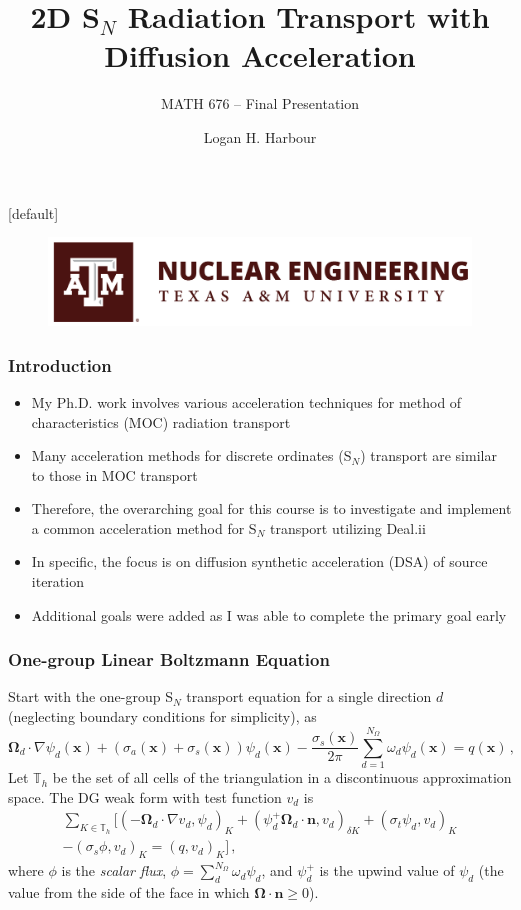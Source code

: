 \documentclass[xcolor={usenames,dvipsnames,svgnames,table}, 10pt]{beamer}
\title[2D S$_N$ with Diffusion Acceleration]{2D S$_N$ Radiation Transport with Diffusion Acceleration}
\subtitle{MATH 676 -- Final Presentation}
\author[Logan Harbour]{Logan H. Harbour}
\institute[]{Department of Nuclear Engineering \\ Texas A\&M University}
\date[May 1, 2019]
\newcommand{\vx}{\mathbf{x}} %
\newcommand{\vo}{\pmb{\Omega}} %
\newcommand{\vn}{\mathbf{n}} %
\newcommand{\pinp}[2]{\left(#1,#2\right)}
\begin{document}
{
[default] 
\begin{frame}
\vfill
\titlepage
\vfill
\begin{figure}[t]
	\centering
	\includegraphics[width=.5\textwidth]{images/nuen}
\end{figure}
\vfill
\end{frame}
}


\begin{frame}\frametitle{Introduction}
	\begin{block}{}
		\begin{itemize}
			\item My Ph.D. work involves various acceleration techniques for method of characteristics (MOC) radiation transport
			\item Many acceleration methods for discrete ordinates (S$_N$) transport are similar to those in MOC transport
			\item Therefore, the overarching goal for this course is to investigate and implement a common acceleration method for S$_N$ transport utilizing Deal.ii
			\item In specific, the focus is on diffusion synthetic acceleration (DSA) of source iteration
			\item Additional goals were added as I was able to complete the primary goal early
		\end{itemize}
	\end{block}
\end{frame}


\begin{frame}\frametitle{One-group Linear Boltzmann Equation}
	Start with the one-group S$_N$ transport equation for a single direction $d$ (neglecting boundary conditions for simplicity), as
	\begin{equation}
		\label{eq:boltzmann}
		\vo_d \cdot \nabla \psi_d(\vx) + \left(\sigma_a(\vx) + \sigma_s(\vx)\right) \psi_d(\vx) - \frac{\sigma_s(\vx)}{2\pi} \sum_{d = 1}^{N_\Omega} \omega_d \psi_d(\vx) = q(\vx)\,,
	\end{equation}
	Let $\mathbb{T}_h$ be the set of all cells of the triangulation in a discontinuous approximation space. The DG weak form with test function $v_d$ is
	\begin{multline}
		\sum_{K \in \mathbb{T}_h} \Big[ \pinp{-\vo_d \cdot \nabla v_d}{\psi_d}_K + \pinp{\psi_d^+ \vo_d \cdot \vn}{v_d}_{\delta K} + \pinp{\sigma_t \psi_d}{v_d}_K  \\ - \pinp{\sigma_s \phi}{v_d}_K = \pinp{q}{v_d}_K\Big]\,,
	\end{multline}
	where $\phi$ is the \textit{scalar flux}, $\phi = \sum_d^{N_\Omega} \omega_d \psi_d$, and $\psi_d^+$ is the upwind value of $\psi_d$ (the value from the side of the face in which $\vo \cdot \vn \geq 0$).
\end{frame}
\end{document}
